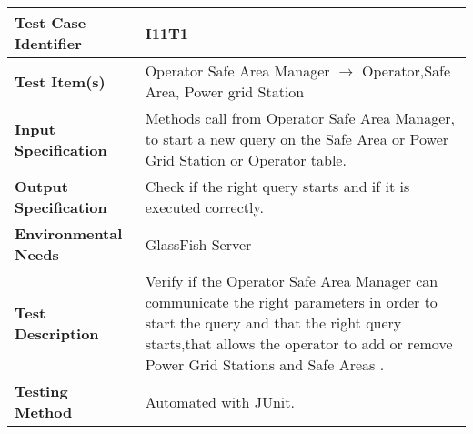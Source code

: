 \begin{tabular}{l p{}}
    \hline
    \textbf{Test Case Identifier} & I11T1\\
    \hline
    \textbf{Test Item(s)} & Operator Safe Area Manager $\rightarrow$ Operator,Safe Area, Power grid Station\\
    \hline
    \textbf{Input Specification} & Methods call from Operator Safe Area Manager, to start a new query on the Safe Area or Power Grid Station or Operator table.\\
    \hline
    \textbf{Output Specification} & Check if the right query starts and if it is executed correctly.\\
    \hline
    \textbf{Environmental Needs} &  GlassFish Server\\
    \hline
    \textbf{Test Description} & Verify if the Operator Safe Area Manager can communicate the right parameters in order to start the query and that the right query starts,that allows the operator to add or remove Power Grid Stations and Safe Areas .\\
    \hline
    \textbf{Testing Method} & Automated with JUnit.\\
    \hline
\end{tabular}